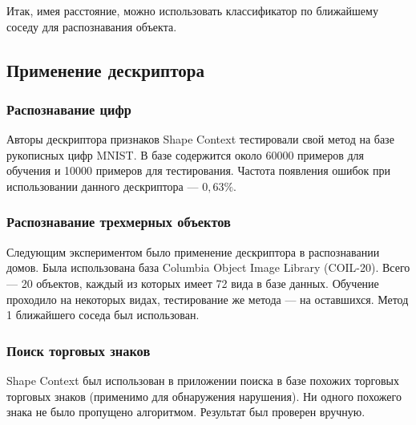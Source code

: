 Итак, имея расстояние, можно использовать классификатор по ближайшему соседу для распознавания объекта.

\subsection{Применение дескриптора}
\subsubsection{Распознавание цифр}
Авторы дескриптора признаков Shape Context тестировали свой метод на базе рукописных цифр MNIST. В базе содержится около 60000 примеров для обучения и 10000 примеров для тестирования. Частота появления ошибок при использовании данного дескриптора --- $0,63\%$.

\subsubsection{Распознавание трехмерных объектов}
Следующим экспериментом было применение дескриптора в распознавании домов. Была использована база Columbia Object Image Library (COIL-20). Всего --- 20 объектов, каждый из которых имеет 72 вида в базе данных. Обучение проходило на некоторых видах, тестирование же метода --- на оставшихся. Метод 1 ближайшего соседа был использован.

\subsubsection{Поиск торговых знаков}
Shape Context был использован в приложении поиска в базе похожих торговых торговых знаков (применимо для обнаружения нарушения). Ни одного похожего знака не было пропущено алгоритмом. Результат был проверен вручную.

\newpage
